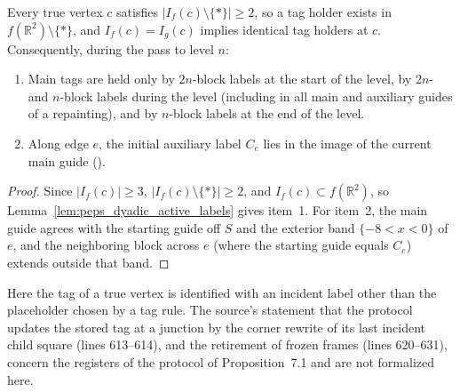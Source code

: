 \begin{lemma}
    \label{lem:peps_dyadic_tags}
    \leanok
    Every true vertex $c$ satisfies $|I_f(c)\setminus\{\ast\}|\ge2$, so a tag
    holder exists in $f(\mathbb R^2)\setminus\{\ast\}$, and $I_f(c)=I_g(c)$
    implies identical tag holders at $c$. Consequently, during the pass to level
    $n$:
    \begin{enumerate}
        \item Main tags are held only by $2n$-block labels at the start of the
              level, by $2n$- and $n$-block labels during the level (including in
              all main and auxiliary guides of a repainting), and by $n$-block
              labels at the end of the level.
        \item Along edge $e$, the initial auxiliary label $C_e$ lies in the image
              of the current main guide
              (\cite[Section~7, lines 610--612, 625--627]{OpenAI2026PolynomialPEPS}).
    \end{enumerate}
\end{lemma}

\begin{proof}\leanok
    Since $|I_f(c)|\ge3$, $|I_f(c)\setminus\{\ast\}|\ge2$, and
    $I_f(c)\subset f(\mathbb R^2)$, so Lemma~\ref{lem:peps_dyadic_active_labels}
    gives item~1. For item~2, the main guide agrees with the starting guide off
    $S$ and the exterior band $\{-8<x<0\}$ of $e$, and the neighboring block across
    $e$ (where the starting guide equals $C_e$) extends outside that band.
\end{proof}

Here the tag of a true vertex is identified with an incident label other than the
placeholder chosen by a tag rule. The source's statement that the protocol updates
the stored tag at a junction by the corner rewrite of its last incident child square
(lines 613--614), and the retirement of frozen frames (lines 620--631), concern the
registers of the protocol of Proposition~7.1 and are not formalized here.

